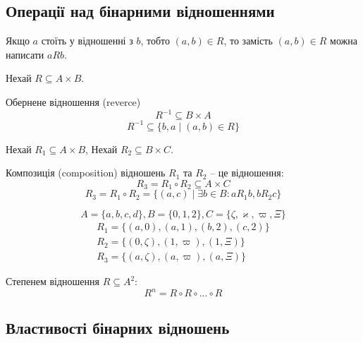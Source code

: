 \subsection{Операції над бінарними відношеннями}

\begin{remark}
    Якщо $a$ стоїть у відношенні з $b$, тобто $(a, b) \in R$,
    то замість $(a, b) \in R$ можна написати $aRb$.    
\end{remark}

Нехай $R \subseteq A \times B$.

\begin{definition}
    Обернене відношення (reverce)
    $$R^{-1} \subseteq B \times A$$
    $$R^{-1} \subseteq \{ b, a \mid (a, b) \in R \}$$
\end{definition}

Нехай $R_1 \subseteq A \times B$, Нехай $R_2 \subseteq B \times C$.

\begin{definition}
    Композиція (composition) відношень $R_1$ та $R_2$ -- це відношення:
    $$R_3 = R_1 \circ R_2 \subseteq A \times C$$
    $$R_3 = R_1 \circ R_2  = \{ (a, c) \mid \exists b \in B: aR_1b, bR_2c \}$$
\end{definition}

\begin{example}
    \begin{equation*}
        A = \{ a, b, c, d \},
        B = \{ 0, 1, 2 \},
        C = \{ \zeta, \varkappa, \varpi, \Xi \}
    \end{equation*}
    \begin{gather*}
        R_1 = \{ (a, 0), (a, 1), (b, 2), (c, 2) \}\\
        R_2 = \{ (0, \zeta), (1, \varpi), (1, \Xi) \}\\
        R_3 = \{ (a, \zeta), (a, \varpi), (a, \Xi) \}
    \end{gather*}
\end{example}

\begin{definition}
    Степенем відношення $R \subseteq A^2$:
    $$R^n = R \circ R \circ ... \circ R$$
    
\end{definition}

\subsection{Властивості бінарних відношень}

